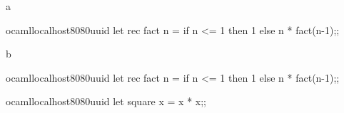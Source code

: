 
\newcommand{\studentemail}{spqr1@cam.ac.uk}



    \begin{question}{1}
        \begin{subquestion}{a}
            \begin{automarkable}{ocaml}{localhost}{8080}{uuid}
                let rec fact n =
                  if n <= 1 then 1 else n * fact(n-1);;
            \end{automarkable}
        \end{subquestion}
        \begin{subquestion}{b}
            \begin{automarkable}{ocaml}{localhost}{8080}{uuid}
                let rec fact n =
                  if n <= 1 then 1 else n * fact(n-1);;
            \end{automarkable}
        \end{subquestion}
    \end{question}

    \begin{question}{2}
        \begin{automarkable}{ocaml}{localhost}{8080}{uuid}
            let square x = x * x;;
        \end{automarkable}
    \end{question}
